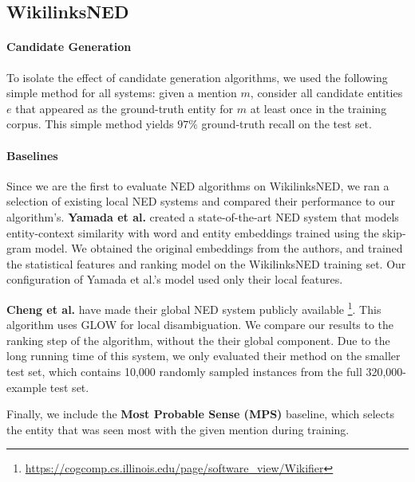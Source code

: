 \documentclass[11pt]{article}
\begin{document}
\subsection{WikilinksNED}

\paragraph{Candidate Generation}
To isolate the effect of candidate generation algorithms, we used the following simple method for all systems: given a mention $m$, consider all candidate entities $e$ that appeared as the ground-truth entity for $m$ at least once in the training corpus. This simple method yields $97\%$ ground-truth recall on the test set.

\paragraph{Baselines}
Since we are the first to evaluate NED algorithms on WikilinksNED, we ran a selection of existing local NED systems and compared their performance to our algorithm's. \textbf{Yamada et al.}  created a state-of-the-art NED system that models entity-context similarity with word and entity embeddings trained using the skip-gram model. We obtained the original embeddings from the authors, and trained the statistical features and ranking model on the WikilinksNED training set. Our configuration of Yamada et al.'s model used only their local features.

\textbf{Cheng et al.}  have made their global NED system publicly available \footnote{\url{https://cogcomp.cs.illinois.edu/page/software\_view/Wikifier}}. This algorithm uses GLOW \cite{Ratinov2011} for local disambiguation. We compare our results to the ranking step of the algorithm, without the their global component. Due to the long running time of this system, we only evaluated their method on the smaller test set, which contains 10,000 randomly sampled instances from the full 320,000-example test set.

Finally, we include the \textbf{Most Probable Sense (MPS)} baseline, which selects the entity that was seen most with the given mention during training.
\end{document}
